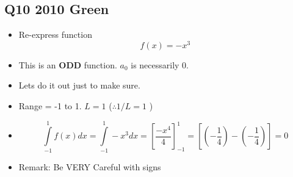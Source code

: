 \documentclass[11pt,a4paper,titlepage,oneside,openany]{article}
\numberwithin{equation}{section}
\numberwithin{algorithm}{section}
\numberwithin{figure}{section}
\numberwithin{table}{section}
\begin{document}
\subsection*{Q10 2010 Green}
\Large{
\begin{itemize}
\item Re-express function \[f(x) = -x^3  \]
\item This is an \textbf{ODD} function. $a_0$ is necessarily 0.
\item Lets do it out just to make sure.
\item Range = -1 to 1. $L=1$ ($\therefore 1/L = 1$ )
\item \[\int\limits^{1}_{-1} f(x) dx =\int\limits^{1}_{-1}-x^3 dx = \left[\frac{-x^4}{4} \right]^{1}_{-1}  = \left[\left(- \frac{1}{4} \right) - \left(- \frac{1}{4} \right) \right]  = 0\]
\item Remark: Be VERY Careful with signs
\end{itemize}
}
\end{document}
